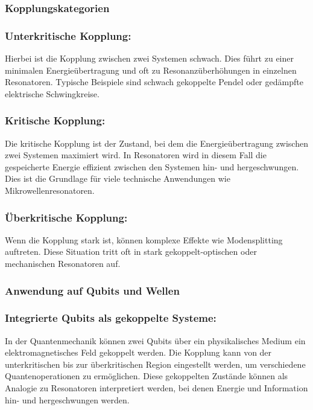 \documentclass[12pt,a4paper]{article}
\begin{document}
	\subsubsection{Kopplungskategorien}
	
	\subsubsection{Unterkritische Kopplung:}
	Hierbei ist die Kopplung zwischen zwei Systemen schwach. Dies führt zu einer minimalen Energieübertragung und oft zu Resonanzüberhöhungen in einzelnen Resonatoren. Typische Beispiele sind schwach gekoppelte Pendel oder gedämpfte elektrische Schwingkreise.
	
	\subsubsection{Kritische Kopplung:}
	Die kritische Kopplung ist der Zustand, bei dem die Energieübertragung zwischen zwei Systemen maximiert wird. In Resonatoren wird in diesem Fall die gespeicherte Energie effizient zwischen den Systemen hin- und hergeschwungen. Dies ist die Grundlage für viele technische Anwendungen wie Mikrowellenresonatoren.
	
	\subsubsection{Überkritische Kopplung:}
	Wenn die Kopplung stark ist, können komplexe Effekte wie Modensplitting auftreten. Diese Situation tritt oft in stark gekoppelt-optischen oder mechanischen Resonatoren auf.
	
	\subsubsection{Anwendung auf Qubits und Wellen}
	
	\subsubsection{Integrierte Qubits als gekoppelte Systeme:}
	In der Quantenmechanik können zwei Qubits über ein physikalisches Medium  ein elektromagnetisches Feld gekoppelt werden. Die Kopplung kann von der unterkritischen bis zur überkritischen Region eingestellt werden, um verschiedene Quantenoperationen zu ermöglichen. Diese gekoppelten Zustände können als Analogie zu Resonatoren interpretiert werden, bei denen Energie und Information hin- und hergeschwungen werden.
	
\end{document}
